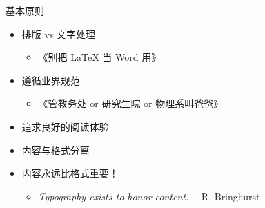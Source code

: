 \begin{frame}{基本原则}
\begin{itemize}
  \item<+-> 排版 vs 文字处理

    \begin{itemize}
      \item 《别把 \LaTeX{} 当 Word 用》
    \end{itemize}

  \item<+-> 遵循业界规范

    \begin{itemize}
      \item 《管教务处 or 研究生院 or 物理系叫爸爸》
    \end{itemize}

  \item<+-> 追求良好的阅读体验
  \item<+-> 内容与格式分离
  \item<+-> \alert{内容永远比格式重要！}

    \begin{itemize}
      \item \emph{Typography exists to honor content.} ---R. Bringhurst
    \end{itemize}
\end{itemize}
\end{frame}

